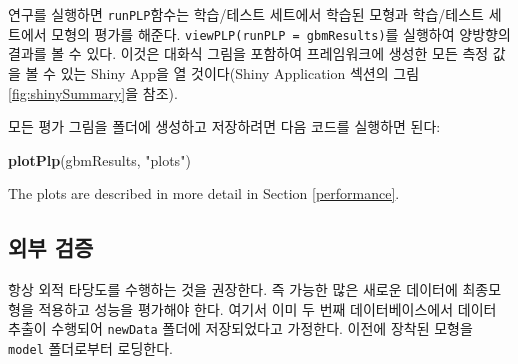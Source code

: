 \documentclass[11pt]{book}
\newenvironment{Shaded}{\begin{snugshade}}{\end{snugshade}}
\newcommand{\KeywordTok}[1]{\textcolor[rgb]{0.13,0.29,0.53}{\textbf{#1}}}
\newcommand{\StringTok}[1]{\textcolor[rgb]{0.31,0.60,0.02}{#1}}
\newcommand{\NormalTok}[1]{#1}
\theoremstyle{definition}
\theoremstyle{definition}
\theoremstyle{definition}
\theoremstyle{remark}
\begin{document}
연구를 실행하면 \texttt{runPLP}함수는 학습/테스트 세트에서 학습된 모형과
학습/테스트 세트에서 모형의 평가를 해준다.
\texttt{viewPLP(runPLP\ =\ gbmResults)}를 실행하여 양방향의 결과를 볼 수
있다. 이것은 대화식 그림을 포함하여 프레임워크에 생성한 모든 측정 값을
볼 수 있는 Shiny App을 열 것이다(Shiny Application 섹션의 그림
\ref{fig:shinySummary}을 참조).

모든 평가 그림을 폴더에 생성하고 저장하려면 다음 코드를 실행하면 된다:

\begin{Shaded}
\begin{Highlighting}[]
\KeywordTok{plotPlp}\NormalTok{(gbmResults, }\StringTok{"plots"}\NormalTok{)}
\end{Highlighting}
\end{Shaded}

The plots are described in more detail in Section \ref{performance}.

\subsection{외부 검증}\label{-}

항상 외적 타당도를 수행하는 것을 권장한다. 즉 가능한 많은 새로운
데이터에 최종모형을 적용하고 성능을 평가해야 한다. 여기서 이미 두 번째
데이터베이스에서 데이터 추출이 수행되어 \texttt{newData} 폴더에
저장되었다고 가정한다. 이전에 장착된 모형을 \texttt{model} 폴더로부터
로딩한다.
\end{document}
